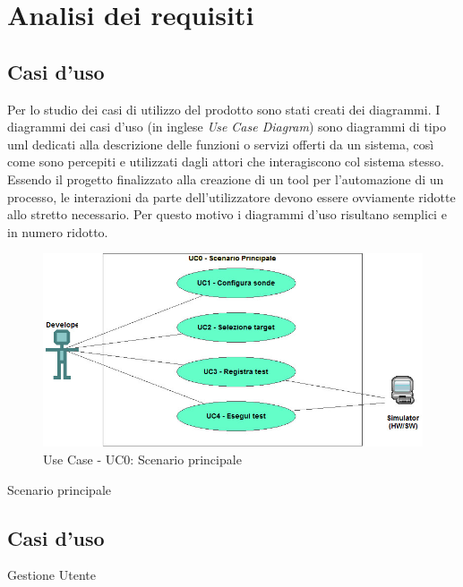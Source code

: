 \chapter{Analisi dei requisiti}
\label{chap:analisi-requisiti}

\section{Casi d'uso}
Per lo studio dei casi di utilizzo del prodotto sono stati creati dei diagrammi.
I diagrammi dei casi d'uso (in inglese \emph{Use Case Diagram}) sono diagrammi di tipo \gls{uml} dedicati alla descrizione delle funzioni o servizi offerti da un sistema, così come sono percepiti e utilizzati dagli attori che interagiscono col sistema stesso.
Essendo il progetto finalizzato alla creazione di un tool per l'automazione di un processo, le interazioni da parte dell'utilizzatore devono essere ovviamente ridotte allo stretto necessario. Per questo motivo i diagrammi d'uso risultano semplici e in numero ridotto.

\begin{figure}[ht] 
    \centering 
    \includegraphics[width=0.7\columnwidth]{img/usecase/scenario-principale.jpeg} 
    \caption{Use Case - UC0: Scenario principale}
    \label{fig:scenario_principale}
\end{figure}

\begin{usecase}{0}{Scenario principale}
    \label{uc:uc_scenario_principale}
\end{usecase}

\section{Casi d'uso}
\begin{usecase}{1}{Gestione Utente}
    \label{uc:uc_casi_uso}
\end{usecase}

